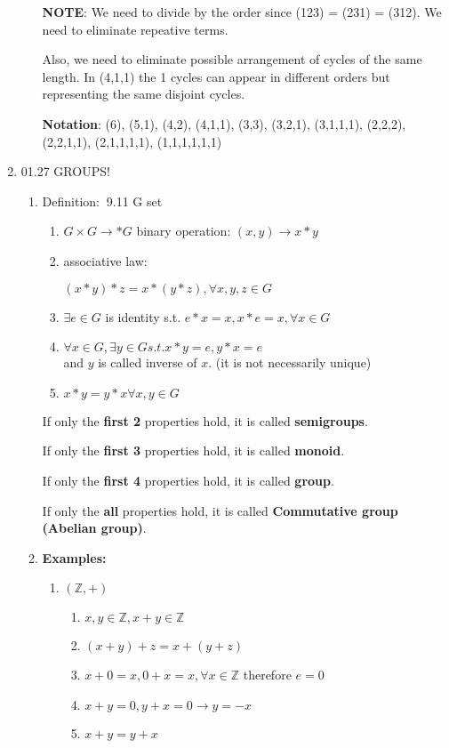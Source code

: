 \documentclass[12pt]{article}
\newcommand{\defi}{{\color{blue} Definition: $\ $}}
\begin{document}
\begin{enumerate}
\begin{enumerate}
        \textbf{NOTE}: We need to divide by the order since (123) = (231) = (312). We need to eliminate repeative terms.
        
        Also, we need to eliminate possible arrangement of cycles of the same length. In (4,1,1) the 1 cycles can appear in different orders but representing the same disjoint cycles.
        
        \textbf{Notation}: (6), (5,1), (4,2), (4,1,1), (3,3), (3,2,1), (3,1,1,1), (2,2,2), (2,2,1,1), (2,1,1,1,1), (1,1,1,1,1,1)
    \end{enumerate}
    
    \item 01.27 GROUPS!
    
    \begin{enumerate}
        \item \defi 9.11 G set 
        \begin{enumerate}
            \item $G \times G \rightarrow * G$ binary operation: $(x,y) \rightarrow x * y$
            \item associative law:
            
            $(x * y) * z= x*(y*z), \forall x,y,z \in G $

            \item $\exists e \in G $ is identity s.t. $e * x = x, x * e = x , \forall x \in G$
            \item $\forall x \in G, \exists y \in G s.t. x*y = e, y*x = e$ \\
            and $y$ is called inverse of $x$. (it is not necessarily unique)
            \item $x * y = y * x \forall x,y \in G$
        \end{enumerate}
        If only the \textbf{first 2} properties hold, it is called \textbf{semigroups}.

        If only the \textbf{first 3} properties hold, it is called \textbf{monoid}.

        If only the \textbf{first 4} properties hold, it is called \textbf{group}.

        If only the \textbf{all} properties hold, it is called \textbf{Commutative group (Abelian group)}.

        \item \textbf{Examples:}

        \begin{enumerate}
            \item $(\mathbb{Z}, + )$
            \begin{enumerate}
                \item $x,y \in \mathbb{Z}, x+y \in \mathbb{Z}$
                \item $(x+y)+z = x+(y+z)$
                \item $x + 0 = x, 0 + x = x, \forall x \in \mathbb{Z}$ therefore $e = 0$
                \item $x + y =0, y + x = 0 \rightarrow y = -x$
                \item $x + y = y + x$
                

\end{enumerate}
\end{enumerate}
\end{enumerate}
\end{enumerate}
\end{document}
